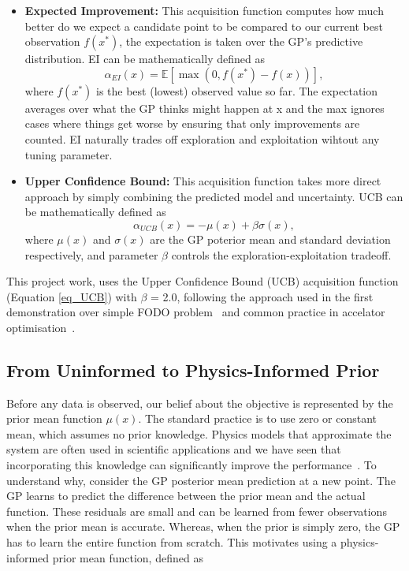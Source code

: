 \begin{itemize}
    \item  \textbf{Expected Improvement:} This acquisition function computes how much better do we expect a candidate point to be compared to our current best observation $f(x^*)$, the expectation is taken over the GP's predictive distribution. EI can be mathematically defined as
            \begin{equation}
                \alpha_{EI}(x) = \mathbb{E}[\max(0, f(x^*) - f(x))],
            \end{equation}
            where $f(x^*)$ is the best (lowest) observed value so far. The expectation averages over what the GP thinks might happen at x and the max ignores cases where things get worse by ensuring that only improvements are counted. EI naturally trades off exploration and exploitation wihtout any tuning parameter. 
    \item \textbf{Upper Confidence Bound:} This acquisition function takes more direct approach by simply combining the predicted model and uncertainty.  UCB can be mathematically defined as
            \begin{equation}
                \label{eq_UCB}
                \alpha_{UCB}(x) = -\mu(x) + \beta \sigma(x),
            \end{equation}
            where $\mu(x)$ and $\sigma(x)$ are the GP poterior mean and standard deviation respectively, and parameter $\beta$ controls the exploration-exploitation tradeoff.  

\end{itemize}

This project work, uses the Upper Confidence Bound (UCB) acquisition function (Equation \ref{eq_UCB}) with $\beta$ = 2.0, 
following the approach used in the first demonstration over simple FODO problem~\cite{kaiser2024bridging} and common practice in accelator 
optimisation~\cite{roussel2024bo}. 


\subsection{From Uninformed to Physics-Informed Prior}

Before any data is observed, our belief about the objective is represented by the prior mean function $\mu(x)$. The standard practice is to use zero or constant mean, 
which assumes no prior knowledge. Physics models that approximate the system are often used in scientific applications and we have seen that incorporating this knowledge can significantly improve the performance~\cite{boltz2025priormeanmodule}. 
To understand why, consider the GP posterior mean prediction at a new point. The GP learns to predict the difference between the prior mean and the actual function. These residuals are small and can be 
learned from fewer observations when the prior mean is accurate. Whereas, when the prior is simply zero, the GP has to learn the entire function from scratch. This motivates using a physics-informed prior mean function, defined as

